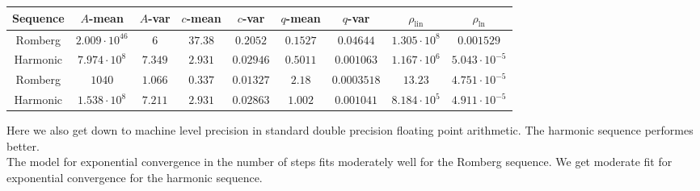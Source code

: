 \begin{table}[H]
    \centering
    \small
    \begin{tabular}{c||c|c|c|c|c|c|c|c}
Sequence & \(A\)-mean & \(A\)-var & \(c\)-mean & \(c\)-var & \(q\)-mean & \(q\)-var & \(\rho_{\operatorname{lin}}\) & \(\rho_{\ln}\)\\\hline
\rowcolor{red}
Romberg & \(2.009\cdot 10^{46}\) & \(6\) & \(37.38\) & \(0.2052\) & \(0.1527\) & \(0.04644\) & \(1.305\cdot 10^8\) & \(0.001529\) \\
\rowcolor{green}
Harmonic & \(7.974\cdot 10^8\) & \(7.349\) & \(2.931\) & \(0.02946\) & \(0.5011\) & \(0.001063\) & \(1.167\cdot 10^6\) & \(5.043\cdot 10^{-5}\) \\
\rowcolor{green}
Romberg & \(1040\) & \(1.066\) & \(0.337\) & \(0.01327\) & \(2.18\) & \(0.0003518\) & \(13.23\) & \(4.751\cdot 10^{-5}\) \\
\rowcolor{green}
Harmonic & \(1.538\cdot 10^8\) & \(7.211\) & \(2.931\) & \(0.02863\) & \(1.002\) & \(0.001041\) & \(8.184\cdot 10^5\) & \(4.911\cdot 10^{-5}\) \\
    \end{tabular}
    \label{tab:my_label}
\end{table}

Here we also get down to machine level precision in standard double precision floating point arithmetic. The harmonic sequence performes better.\\

The model for exponential convergence in the number of steps fits moderately well for the Romberg sequence. We get moderate fit for exponential convergence for the harmonic sequence.